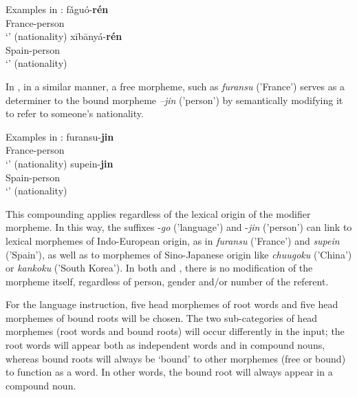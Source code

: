 \documentclass[output=paper,colorlinks,citecolor=brown,modfonts,nonflat]{../langscibook}
\begin{document}
\ea%
    \label{ex:watorek:8}
    Examples in :
    \ea%
    \label{ex:watorek:8a}
        \gll    fǎguó-\textbf{{rén}}\\
                France-{person}\\
        \glt    ‘’ (nationality)
    \ex%
    \label{ex:watorek:8b}
        \gll    xībānyá-\textbf{{rén}}\\
                Spain-{person}\\
        \glt    ‘’ (nationality)
    \z
\z

In , in a similar manner, a free morpheme, such as \textit{furansu} ('France') serves as a determiner to the bound morpheme \textit{–jin} ('person') by semantically modifying it to refer to someone's nationality.


\ea%
    \label{ex:watorek:9}
    Examples in :
    \ea%
    \label{ex:watorek:9a}
        \gll    furansu-\textbf{{jin}}\\
                France-{person}\\
        \glt    ‘’ (nationality)
    \ex%
    \label{ex:watorek:9b}
        \gll    supein-\textbf{{jin}}\\
                Spain-{person}\\
        \glt    ‘’ (nationality)
    \z
\z

This compounding applies regardless of the lexical origin of the modifier morpheme. In this way, the suffixes -\textit{go} ('language') and -\textit{jin} ('person') can link to lexical morphemes of {Indo-European} origin, as in \textit{furansu} ('France') and \textit{supein} ('Spain'), as well as to morphemes of Sino-{Japanese} origin like \textit{chuugoku} ('China') or \textit{kankoku} ('South Korea'). In both  and , there is no modification of the morpheme itself, regardless of person, gender and/or number of the referent.

For the  language instruction, five head morphemes of root words and five head morphemes of bound roots will be chosen. The two sub-categories of head morphemes (root words and bound roots) will occur differently in the input; the root words will appear both as independent words and in compound nouns, whereas bound roots will always be ‘bound’ to other morphemes (free or bound) to function as a word. In other words, the bound root will always appear in a compound noun.
\end{document}
